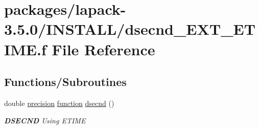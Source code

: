 \hypertarget{dsecnd__EXT__ETIME_8f}{}\section{packages/lapack-\/3.5.0/\+I\+N\+S\+T\+A\+L\+L/dsecnd\+\_\+\+E\+X\+T\+\_\+\+E\+T\+I\+M\+E.f File Reference}
\label{dsecnd__EXT__ETIME_8f}
\subsection*{Functions/\+Subroutines}
\begin{DoxyCompactItemize}
\item 
double \hyperlink{numinquire_8h_a2c8e616467665d0b2814d4c1589ba74e}{precision} \hyperlink{afunc_8m_a7b5e596df91eadea6c537c0825e894a7}{function} \hyperlink{group__auxOTHERauxiliary_gafe21a6b76340ac0afd7f0f84326e7918}{dsecnd} ()
\begin{DoxyCompactList}\small\item\em {\bfseries D\+S\+E\+C\+N\+D} Using E\+T\+I\+M\+E \end{DoxyCompactList}\end{DoxyCompactItemize}
